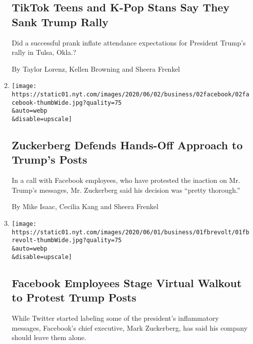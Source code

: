 \begin{enumerate}
  \hypertarget{tiktok-teens-and-k-pop-stans-say-they-sank-trump-rally}{%
  \subsection{TikTok Teens and K-Pop Stans Say They Sank Trump
  Rally}\label{tiktok-teens-and-k-pop-stans-say-they-sank-trump-rally}}

  Did a successful prank inflate attendance expectations for President
  Trump's rally in Tulsa, Okla.?

  By Taylor Lorenz, Kellen Browning and Sheera Frenkel
\item
  \href{/2020/06/02/technology/zuckerberg-defends-facebook-trump-posts.html}{}

  \texttt{[image: https://static01.nyt.com/images/2020/06/02/business/02facebook/02facebook-thumbWide.jpg?quality=75\\\&auto=webp\\\&disable=upscale]}

  \hypertarget{zuckerberg-defends-hands-off-approach-to-trumps-posts}{%
  \subsection{Zuckerberg Defends Hands-Off Approach to Trump's
  Posts}\label{zuckerberg-defends-hands-off-approach-to-trumps-posts}}

  In a call with Facebook employees, who have protested the inaction on
  Mr. Trump's messages, Mr. Zuckerberg said his decision was ``pretty
  thorough.''

  By Mike Isaac, Cecilia Kang and Sheera Frenkel
\item
  \href{/2020/06/01/technology/facebook-employee-protest-trump.html}{}

  \texttt{[image: https://static01.nyt.com/images/2020/06/01/business/01fbrevolt/01fbrevolt-thumbWide.jpg?quality=75\\\&auto=webp\\\&disable=upscale]}

  \hypertarget{facebook-employees-stage-virtual-walkout-to-protest-trump-posts}{%
  \subsection{Facebook Employees Stage Virtual Walkout to Protest Trump
  Posts}\label{facebook-employees-stage-virtual-walkout-to-protest-trump-posts}}

  While Twitter started labeling some of the president's inflammatory
  messages, Facebook's chief executive, Mark Zuckerberg, has said his
  company should leave them alone.


\end{enumerate}
